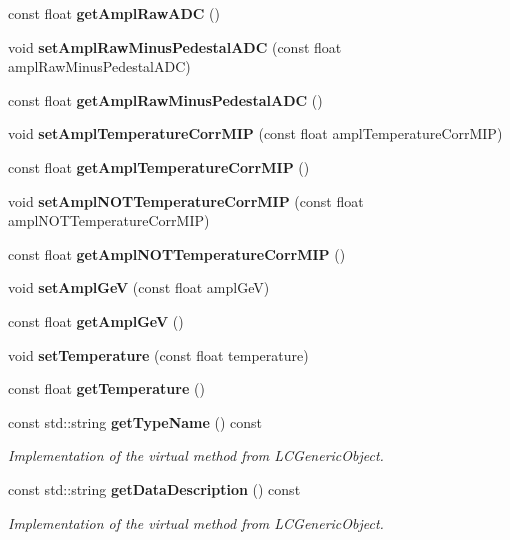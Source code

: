 \begin{DoxyCompactItemize}
\item 
const float {\bfseries getAmplRawADC} ()\label{classCALICE_1_1AhcAmplitude_a367d193df67de6046af58982ccb6e2ba}

\item 
void {\bfseries setAmplRawMinusPedestalADC} (const float amplRawMinusPedestalADC)\label{classCALICE_1_1AhcAmplitude_af248705124029b6a523b1c79b189b0bd}

\item 
const float {\bfseries getAmplRawMinusPedestalADC} ()\label{classCALICE_1_1AhcAmplitude_ad514eaba7b4412210f37a950b4abfe97}

\item 
void {\bfseries setAmplTemperatureCorrMIP} (const float amplTemperatureCorrMIP)\label{classCALICE_1_1AhcAmplitude_a0d3fd86e8d35dbbc05b3cca3f3421e75}

\item 
const float {\bfseries getAmplTemperatureCorrMIP} ()\label{classCALICE_1_1AhcAmplitude_a0b607cb3be3e999a5ac7b38dc459dd3a}

\item 
void {\bfseries setAmplNOTTemperatureCorrMIP} (const float amplNOTTemperatureCorrMIP)\label{classCALICE_1_1AhcAmplitude_aa26157732c7138aaee6ad7f194a3bca6}

\item 
const float {\bfseries getAmplNOTTemperatureCorrMIP} ()\label{classCALICE_1_1AhcAmplitude_a755d45a5e563ce40e17d312d444d99ab}

\item 
void {\bfseries setAmplGeV} (const float amplGeV)\label{classCALICE_1_1AhcAmplitude_a445c83887997f254e988e914eed7b670}

\item 
const float {\bfseries getAmplGeV} ()\label{classCALICE_1_1AhcAmplitude_a4289af7ccb604b8a2db0e8202efe6374}

\item 
void {\bfseries setTemperature} (const float temperature)\label{classCALICE_1_1AhcAmplitude_ab2872aa24017885f071a7e66181c5913}

\item 
const float {\bfseries getTemperature} ()\label{classCALICE_1_1AhcAmplitude_a8e820e9eb754d24fa5e6d87e2f30c00b}

\item 
const std::string {\bf getTypeName} () const 
\begin{DoxyCompactList}\small\item\em Implementation of the virtual method from LCGenericObject. \item\end{DoxyCompactList}\item 
const std::string {\bf getDataDescription} () const 
\begin{DoxyCompactList}\small\item\em Implementation of the virtual method from LCGenericObject. \item\end{DoxyCompactList}\end{DoxyCompactItemize}
